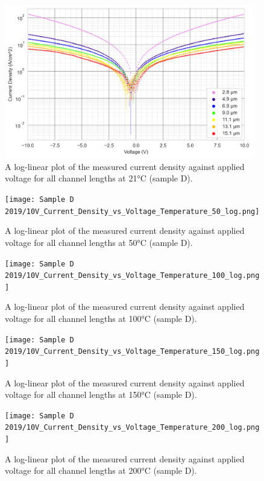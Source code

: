 \begin{figure}[h]
    \centering
    \includegraphics[width=0.97\textwidth]{Chapter3/Figs/Raster/Sample D 2019/10V_Current_Density_vs_Voltage_Temperature_21_log.png}
    \caption{A log-linear plot of the measured current density against applied voltage for all channel lengths at 21\si{\degreeCelsius} (sample D).}
    \label{appfig:10V_D_current_density_21}
\end{figure}
\begin{figure}[h]
    \centering
    \texttt{[image: Sample D 2019/10V\_Current\_Density\_vs\_Voltage\_Temperature\_50\_log.png]}
    \caption{A log-linear plot of the measured current density against applied voltage for all channel lengths at 50\si{\degreeCelsius} (sample D).}
    \label{appfig:10V_D_current_density_50}
\end{figure}
\begin{figure}[h]
    \centering
    \texttt{[image: Sample D 2019/10V\_Current\_Density\_vs\_Voltage\_Temperature\_100\_log.png]}
    \caption{A log-linear plot of the measured current density against applied voltage for all channel lengths at 100\si{\degreeCelsius} (sample D).}
    \label{appfig:10V_D_current_density_100}
\end{figure}
\begin{figure}[h]
    \centering
    \texttt{[image: Sample D 2019/10V\_Current\_Density\_vs\_Voltage\_Temperature\_150\_log.png]}
    \caption{A log-linear plot of the measured current density against applied voltage for all channel lengths at 150\si{\degreeCelsius} (sample D).}
    \label{appfig:10V_D_current_density_150}
\end{figure}
\begin{figure}[h]
    \centering
    \texttt{[image: Sample D 2019/10V\_Current\_Density\_vs\_Voltage\_Temperature\_200\_log.png]}
    \caption{A log-linear plot of the measured current density against applied voltage for all channel lengths at 200\si{\degreeCelsius} (sample D).}
    \label{appfig:10V_D_current_density_200}
\end{figure}
